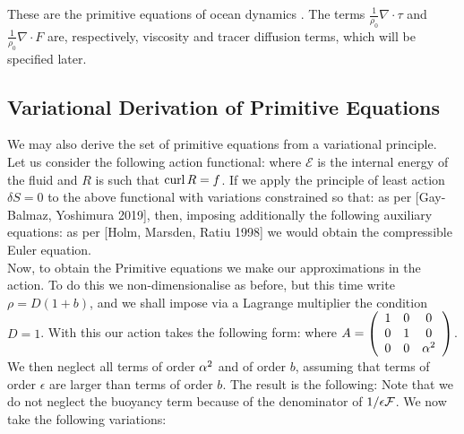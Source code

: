 These are the primitive equations of ocean dynamics \cite{adcroft_2004}. The terms  $\frac{1}{\rho_{0}}\nabla\cdot\tau $ and $\frac{1}{\rho_{0}}\nabla\cdot F$ are, respectively, viscosity and tracer diffusion terms, which will be specified later.
\iffalse
\subsection{Variational Derivation of Primitive Equations}

We may also derive the set of primitive equations from a variational principle. Let us consider the following action functional:
where $\mathcal{E}$ is the internal energy of the fluid and $R$ is such that $\operatorname{curl} R = f$. If we apply the principle of least action $\delta S =0 $ to the above functional with variations constrained so that:
as per [Gay-Balmaz, Yoshimura 2019], then, imposing additionally the following auxiliary equations:
as per [Holm, Marsden, Ratiu 1998] we would obtain the compressible Euler equation. \\
\linebreak
Now, to obtain the Primitive equations we make our approximations in the action. To do this we non-dimensionalise as before, but this time write $\rho = D(1+ b)$, and we shall impose via a Lagrange multiplier the condition $D=1$. With this our action takes the following form:
where $A = \left(\begin{array}{ccc}1&0&0\\0&1&0\\0&0&\alpha^{2} \end{array}\right)$. We then neglect all terms of order $\alpha^{2}$ and of order $b$, assuming that terms of order $\epsilon$ are larger than terms of order $b$. The result is the following:
Note that we do not neglect the buoyancy term because of the denominator of $1/\epsilon\mathcal{F}$. We now take the following variations:
